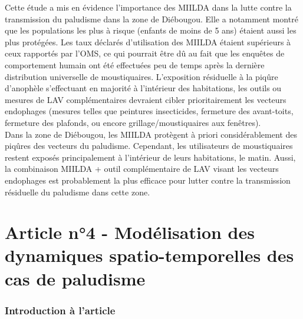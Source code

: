 \documentclass[12pt,twoside]{reedthesis}
\begin{document}
Cette étude a mis en évidence l'importance des MIILDA dans la lutte contre la transmission du paludisme dans la zone de Diébougou. Elle a notamment montré que les populations les plus à risque (enfants de moins de 5 ans) étaient aussi les plus protégées. Les taux déclarés d'utilisation des MIILDA étaient supérieurs à ceux rapportés par l'OMS, ce qui pourrait être dû au fait que les enquêtes de comportement humain ont été effectuées peu de temps après la dernière distribution universelle de moustiquaires. L'exposition résiduelle à la piqûre d'anophèle s'effectuant en majorité à l'intérieur des habitations, les outils ou mesures de LAV complémentaires devraient cibler prioritairement les vecteurs endophages (mesures telles que peintures insecticides, fermeture des avant-toits, fermeture des plafonds, ou encore grillage/moustiquaires aux fenêtres).\\

Dans la zone de Diébougou, les MIILDA protègent à priori considérablement des piqûres des vecteurs du paludisme. Cependant, les utilisateurs de moustiquaires restent exposés principalement à l'intérieur de leurs habitations, le matin. Aussi, la combinaison MIILDA + outil complémentaire de LAV visant les vecteurs endophages est probablement la plus efficace pour lutter contre la transmission résiduelle du paludisme dans cette zone.

\hypertarget{article-n4---moduxe9lisation-des-dynamiques-spatio-temporelles-des-cas-de-paludisme}{%
\section{Article n°4 - Modélisation des dynamiques spatio-temporelles des cas de paludisme}\label{article-n4---moduxe9lisation-des-dynamiques-spatio-temporelles-des-cas-de-paludisme}}

\hypertarget{introduction-uxe0-larticle-1}{%
\subsubsection{Introduction à l'article}\label{introduction-uxe0-larticle-1}}
\end{document}
